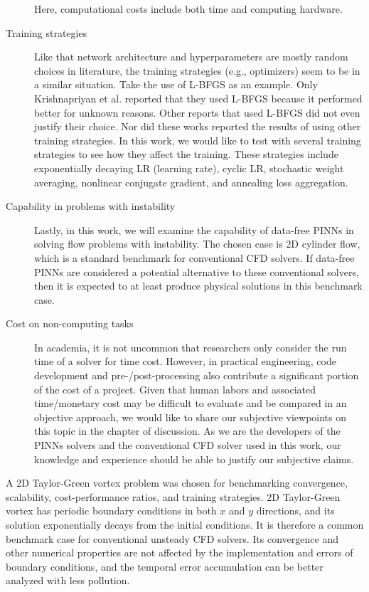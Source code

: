 \begin{description}
        Here, computational costs include both time and computing hardware.
    \item[Training strategies]
        Like that network architecture and hyperparameters are mostly random choices in literature, the training strategies (e.g., optimizers) seem to be in a similar situation.
        Take the use of L-BFGS as an example.
        Only Krishnapriyan et al. \cite{krishnapriyan_characterizing_2021} reported that they used L-BFGS because it performed better for unknown reasons.
        Other reports that used L-BFGS did not even justify their choice.
        Nor did these works reported the results of using other training strategies.
        In this work, we would like to test with several training strategies to see how they affect the training.
        These strategies include exponentially decaying LR (learning rate), cyclic LR, stochastic weight averaging, nonlinear conjugate gradient, and annealing loss aggregation.
    \item[Capability in problems with instability]
        Lastly, in this work, we will examine the capability of data-free PINNs in solving flow problems with instability.
        The chosen case is 2D cylinder flow, which is a standard benchmark for conventional CFD solvers.
        If data-free PINNs are considered a potential alternative to these conventional solvers, then it is expected to at least produce physical solutions in this benchmark case.
    \item[Cost on non-computing tasks]
        In academia, it is not uncommon that researchers only consider the run time of a solver for time cost.
        However, in practical engineering, code development and pre-/post-processing also contribute a significant portion of the cost of a project.
        Given that human labors and associated time/monetary cost may be difficult to evaluate and be compared in an objective approach, we would like to share our subjective viewpoints on this topic in the chapter of discussion.
        As we are the developers of the PINNs solvers and the conventional CFD solver used in this work, our knowledge and experience should be able to justify our subjective claims.
\end{description}

A 2D Taylor-Green vortex problem was chosen for benchmarking convergence, scalability, cost-performance ratios, and training strategies.
2D Taylor-Green vortex has periodic boundary conditions in both $x$ and $y$ directions, and its solution exponentially decays from the initial conditions.
It is therefore a common benchmark case for conventional unsteady CFD solvers.
Its convergence and other numerical properties are not affected by the implementation and errors of boundary conditions, and the temporal error accumulation can be better analyzed with less pollution.

